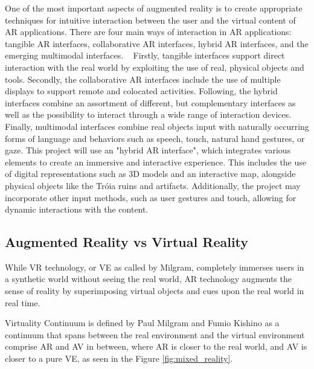 One of the most important aspects of augmented reality is to create appropriate techniques
for intuitive interaction between the user and the virtual content of \gls{AR} applications. There
are four main ways of interaction in \gls{AR} applications: tangible \gls{AR} interfaces, collaborative
\gls{AR} interfaces, hybrid \gls{AR} interfaces, and the emerging multimodal interfaces. ~\cite{carmigniani2011augmented}
Firstly, tangible interfaces support direct interaction with the real world by exploiting the use of
real, physical objects and tools. Secondly, the collaborative \gls{AR} interfaces include the use of multiple displays to support remote and colocated activities.
Following, the hybrid interfaces combine an assortment of different, but complementary interfaces as well
as the possibility to interact through a wide range of interaction devices.
Finally, multimodal interfaces combine real objects input with naturally occurring forms of language
and behaviors such as speech, touch, natural hand gestures, or gaze. This project will use an "hybrid \gls{AR} interface", which integrates various elements to create an immersive and interactive experience.
This includes the use of digital representations such as \gls{3D} models and an interactive map, alongside physical objects like the Tróia ruins and artifacts.
Additionally, the project may incorporate other input methods, such as user gestures and touch, allowing for dynamic interactions with the content. 


\subsection{Augmented Reality vs Virtual Reality}
\label{sec:mix_reality}

While \gls{VR} technology, or \gls{VE} as called by Milgram, completely immerses users in a synthetic world
without seeing the real world, \gls{AR} technology augments the sense of reality by superimposing virtual objects and cues upon the real world in real time. 

Virtuality Continuum is defined by Paul Milgram and Fumio Kishino as a continuum that spans between the real environment
and the virtual environment comprise \gls{AR} and \gls{AV}
in between, where \gls{AR} is closer to the real world, and \gls{AV} is closer to a pure \gls{VE}, as seen in the Figure \ref{fig:mixed_reality}.

